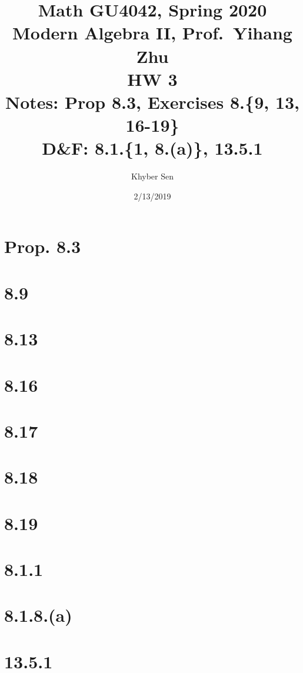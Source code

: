 \documentclass[fleqn]{article}
\title{
Math GU4042, Spring 2020 \\
Modern Algebra II, Prof.\ Yihang Zhu \\
HW 3 \\
Notes: Prop 8.3, Exercises 8.\{9, 13, 16-19\} \\
D\&F: 8.1.\{1, 8.(a)\}, 13.5.1
}
\author{Khyber Sen}
\date{2/13/2019}
\begin{document}
    
    \maketitle
    
    \section{Prop. 8.3}
    
    \section{8.9}
    
    \section{8.13}
    
    \section{8.16}
    
    \section{8.17}
    
    \section{8.18}
    
    \section{8.19}
    
    \section{8.1.1}
    
    \section{8.1.8.(a)}
    
    \section{13.5.1}
    
    
\end{document}

